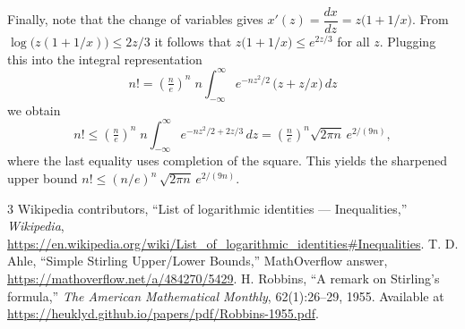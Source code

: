 \documentclass[11pt]{article}
\begin{document}
Finally, note that the change of variables gives $x'(z) = \dfrac{dx}{dz} = z\bigl(1+1/x\bigr)$. From $\log\bigl(z(1+1/x)\bigr) \le 2z/3$ it follows that $z\bigl(1+1/x\bigr) \le e^{2z/3}$ for all $z$. Plugging this into the integral representation
\[
 n! = \left(\tfrac{n}{e}\right)^n \; n \int_{-\infty}^{\infty} e^{-n z^2/2}\, \bigl(z+z/x\bigr)\, dz
\]
we obtain
\[
 n! \le \left(\tfrac{n}{e}\right)^n \; n \int_{-\infty}^{\infty} e^{-n z^2/2 + 2z/3}\, dz
 = \left(\tfrac{n}{e}\right)^n \sqrt{2\pi n}\, e^{2/(9n)},
\]
where the last equality uses completion of the square. This yields the sharpened upper bound $n! \le (n/e)^n\, \sqrt{2\pi n}\, e^{2/(9n)}$.

\begin{thebibliography}{3}
Wikipedia contributors, ``List of logarithmic identities — Inequalities,''
\emph{Wikipedia}, \url{https://en.wikipedia.org/wiki/List_of_logarithmic_identities#Inequalities}.
T. D. Ahle, ``Simple Stirling Upper/Lower Bounds,'' MathOverflow answer, \url{https://mathoverflow.net/a/484270/5429}.
H. Robbins, ``A remark on Stirling's formula,'' \emph{The American Mathematical Monthly}, 62(1):26--29, 1955. Available at \url{https://heuklyd.github.io/papers/pdf/Robbins-1955.pdf}.
\end{thebibliography}
\end{document}
